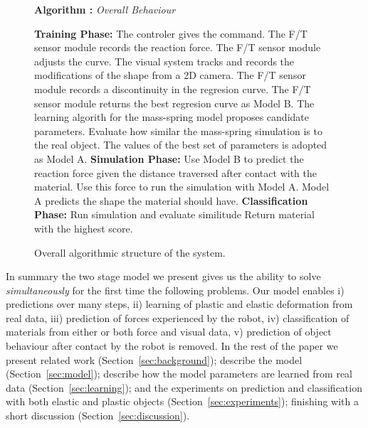 \documentclass[journal]{IEEEtran}
\newcounter{algorithm}
\newenvironment{algorithmicieee}[1]
  {\refstepcounter{algorithm}
   \begin{lrbox}{\ieeealgbox}
   \begin{minipage}{\dimexpr\columnwidth-2\fboxsep-2\fboxrule}
   \textbf{Algorithm \arabic{algorithm}:} \textit{#1} \par
   \begin{algorithmic}[1]}
  {\end{algorithmic}
   \end{minipage}
   \end{lrbox}\noindent\fbox{\usebox{\ieeealgbox}}}
\begin{document}
\begin{figure}
 \begin{algorithmicieee}{Overall Behaviour}\label{alg:overall}
 {\small
 \STATE \textbf{Training Phase:}
     \STATE The controler gives the command.
       \STATE The F/T sensor module records the reaction force.
         \STATE The F/T sensor module adjusts the curve.
       \ENDFOR
       \STATE The visual system tracks and records the modifications of the shape from a 2D camera.
     \ENDWHILE
     \STATE The F/T sensor module records a discontinuity in the regresion curve.
   \ENDFOR
   \STATE The F/T sensor module returns the best regresion curve as Model B.
   \STATE The learning algorith for the mass-spring model proposes candidate parameters.
       \STATE Evaluate how similar the mass-spring simulation is to the real object.
     \ENDFOR
   \ENDFOR
   \STATE The values of the best set of parameters is adopted as Model A.
 \ENDFOR
 \STATE \textbf{Simulation Phase:}
   \STATE Use Model B to predict the reaction force given the distance traversed after contact with the material.
   \STATE Use this force to run the simulation with Model A.
   \STATE Model A predicts the shape the material should have.
 \ENDWHILE
 \STATE \textbf{Classification Phase:}
    \STATE Run simulation and evaluate similitude
  \ENDFOR
 \ENDFOR
 \STATE Return material with the highest score.}
 \end{algorithmicieee}
\caption{Overall algorithmic structure of the system.}
\end{figure}

In summary the two stage model we present gives us the ability to solve {\em simultaneously} for the first time the following problems. Our model enables i) predictions over many steps, ii) learning of plastic and elastic deformation from real data, iii) prediction of forces experienced by the robot, iv) classification of materials from either or both force and visual data, v) prediction of object behaviour after contact by the robot is removed. In the rest of the paper we present related work (Section~\ref{sec:background}); describe the model (Section~\ref{sec:model}); describe how the model parameters are learned from real data (Section~\ref{sec:learning}); and the experiments on prediction and classification with both elastic and plastic objects (Section~\ref{sec:experiments}); finishing with a short discussion (Section~\ref{sec:discussion}).
\end{document}
